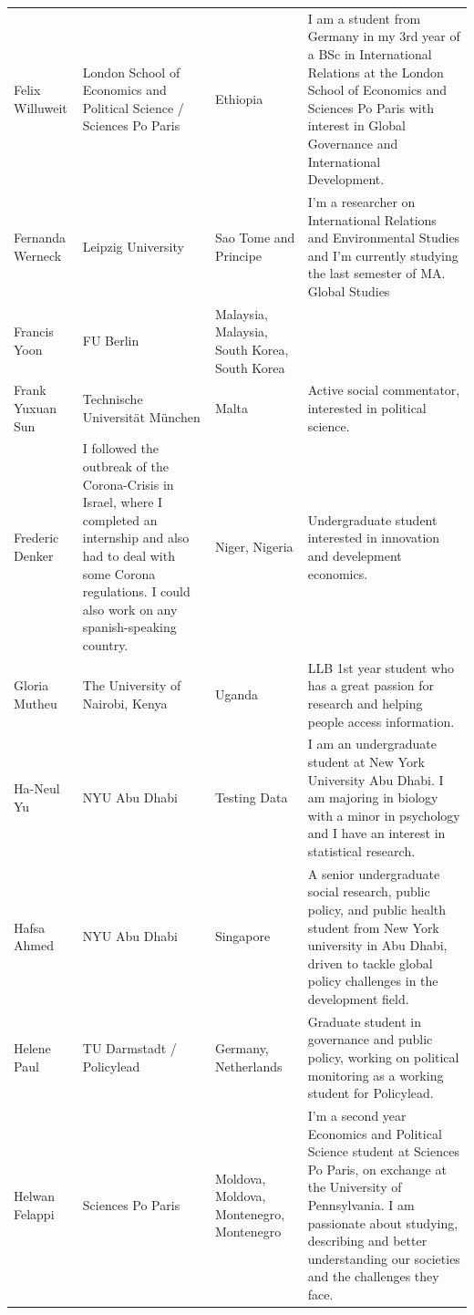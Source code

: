\documentclass[]{article}
\begin{document}
\begin{longtable}{l>{\raggedright\arraybackslash}p{2cm}>{\raggedright\arraybackslash}p{2cm}>{\raggedright\arraybackslash}p{3cm}}
\rowcolor{gray!6}  Felix Willuweit & London School of Economics and Political Science / Sciences Po Paris & Ethiopia & I am a student from Germany in my 3rd year of a BSc in International Relations at the London School of Economics and Sciences Po Paris with interest in Global Governance and International Development.\\
\addlinespace
Fernanda Werneck & Leipzig University & Sao Tome and Principe & I'm a researcher on International Relations and Environmental Studies and I'm currently studying the last semester of MA. Global Studies\\
\rowcolor{gray!6}  Francis Yoon & FU Berlin & Malaysia, Malaysia, South Korea, South Korea & \\
Frank Yuxuan Sun & Technische Universität München & Malta & Active social commentator, interested in political science.\\
\rowcolor{gray!6}  Frederic Denker & I followed the outbreak of the Corona-Crisis in Israel, where I completed an internship and also had to deal with some Corona regulations. I could also work on any spanish-speaking country. & Niger, Nigeria & Undergraduate student interested in innovation and develepment economics.\\
Gloria Mutheu & The University of Nairobi, Kenya & Uganda & LLB 1st year student who has a great passion for research and helping people access information.\\
\addlinespace
\rowcolor{gray!6}  Ha-Neul Yu & NYU Abu Dhabi & Testing Data & I am an undergraduate student at New York University Abu Dhabi. I am majoring in biology with a minor in psychology and I have an interest in statistical research.\\
Hafsa Ahmed & NYU Abu Dhabi & Singapore & A senior undergraduate social research, public policy, and public health student from New York university in Abu Dhabi, driven to tackle global policy challenges in the development field.\\
\rowcolor{gray!6}  Helene Paul & TU Darmstadt / Policylead & Germany, Netherlands & Graduate student in governance and public policy, working on political monitoring as a working student for Policylead.\\
Helwan Felappi & Sciences Po Paris & Moldova, Moldova, Montenegro, Montenegro & I'm a second year Economics and Political Science student at Sciences Po Paris, on exchange at the University of Pennsylvania. I am passionate about studying, describing and better understanding our societies and the challenges they face.\\

\end{longtable}
\end{document}
